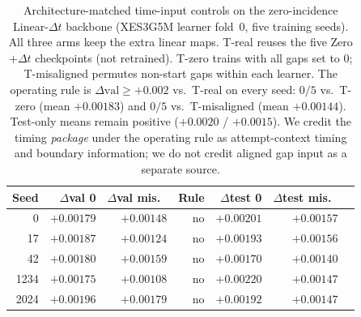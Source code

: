 \begin{table}[H]
\caption{Architecture-matched time-input controls on the zero-incidence
Linear-$\Delta t$ backbone (XES3G5M learner fold~0, five training seeds).
All three arms keep the extra linear maps. T-real reuses the five
Zero$+\Delta t$ checkpoints (not retrained). T-zero trains with all gaps
set to $0$; T-misaligned permutes non-start gaps within each learner.
The operating rule is $\Delta\mathrm{val}\ge{+}0.002$ vs.\ T-real on
every seed: $0/5$ vs.\ T-zero (mean $+0.00183$) and $0/5$ vs.\
T-misaligned (mean $+0.00144$). Test-only means remain positive
($+0.0020$ / $+0.0015$). We credit the timing \emph{package} under the
operating rule as attempt-context timing and boundary information; we do not credit aligned gap input as a separate
source.}
\label{tab:a1-timing}
\centering
\footnotesize
\begin{tabular}{@{}rrrrrrl@{}}
\toprule
Seed & $\Delta$val 0 & $\Delta$val mis.\ & Rule & $\Delta$test 0 & $\Delta$test mis.\ \\
\midrule
0 & $+0.00179$ & $+0.00148$ & no & $+0.00201$ & $+0.00157$ \\
17 & $+0.00187$ & $+0.00124$ & no & $+0.00193$ & $+0.00156$ \\
42 & $+0.00180$ & $+0.00159$ & no & $+0.00170$ & $+0.00140$ \\
1234 & $+0.00175$ & $+0.00108$ & no & $+0.00220$ & $+0.00147$ \\
2024 & $+0.00196$ & $+0.00179$ & no & $+0.00192$ & $+0.00147$ \\
\bottomrule
\end{tabular}
\end{table}
